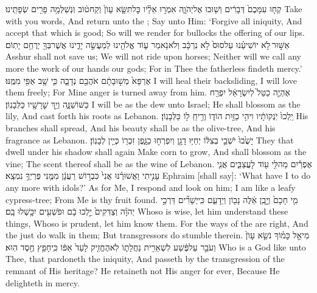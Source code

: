 {קְח֤וּ עִמָּכֶם֙ דְּבָרִ֔ים וְשׁ֖וּבוּ אֶל\maqqaf יְהֹוָ֑ה אִמְר֣וּ אֵלָ֗יו כׇּל\maqqaf תִּשָּׂ֤א עָוֺן֙ וְקַח\maqqaf ט֔וֹב וּֽנְשַׁלְּמָ֥ה פָרִ֖ים שְׂפָתֵֽינוּ׃}
{Take with you words, And return unto the \lord; Say unto Him: ‘Forgive all iniquity, And accept that which is good; So will we render for bullocks the offering of our lips.}
{אַשּׁ֣וּר \legarmeh  לֹ֣א יוֹשִׁיעֵ֗נוּ עַל\maqqaf סוּס֙ לֹ֣א נִרְכָּ֔ב וְלֹא\maqqaf נֹ֥אמַר ע֛וֹד אֱלֹהֵ֖ינוּ לְמַעֲשֵׂ֣ה יָדֵ֑ינוּ אֲשֶׁר\maqqaf בְּךָ֖ יְרֻחַ֥ם יָתֽוֹם׃}
{Asshur shall not save us; We will not ride upon horses; Neither will we call any more the work of our hands our gods; For in Thee the fatherless findeth mercy.’}
{אֶרְפָּא֙ מְשׁ֣וּבָתָ֔ם אֹהֲבֵ֖ם נְדָבָ֑ה כִּ֛י שָׁ֥ב אַפִּ֖י מִמֶּֽנּוּ׃}
{I will heal their backsliding, I will love them freely; For Mine anger is turned away from him.}
{אֶהְיֶ֤ה כַטַּל֙ לְיִשְׂרָאֵ֔ל יִפְרַ֖ח כַּשּׁוֹשַׁנָּ֑ה וְיַ֥ךְ שׇׁרָשָׁ֖יו כַּלְּבָנֽוֹן׃}
{I will be as the dew unto Israel; He shall blossom as the lily, And cast forth his roots as Lebanon.}
{יֵֽלְכוּ֙ יֹֽנְקוֹתָ֔יו וִיהִ֥י כַזַּ֖יִת הוֹד֑וֹ וְרֵ֥יחַֽ ל֖וֹ כַּלְּבָנֽוֹן׃}
{His branches shall spread, And his beauty shall be as the olive-tree, And his fragrance as Lebanon.}
{יָשֻׁ֙בוּ֙ יֹשְׁבֵ֣י בְצִלּ֔וֹ יְחַיּ֥וּ דָגָ֖ן וְיִפְרְח֣וּ כַגָּ֑פֶן זִכְר֖וֹ כְּיֵ֥ין לְבָנֽוֹן׃}
{They that dwell under his shadow shall again Make corn to grow, And shall blossom as the vine; The scent thereof shall be as the wine of Lebanon.}
{אֶפְרַ֕יִם מַה\maqqaf לִּ֥י ע֖וֹד לָעֲצַבִּ֑ים אֲנִ֧י עָנִ֣יתִי וַאֲשׁוּרֶ֗נּוּ אֲנִי֙ כִּבְר֣וֹשׁ רַעֲנָ֔ן מִמֶּ֖נִּי פֶּרְיְךָ֥ נִמְצָֽא׃}
{Ephraim [shall say]: ‘What have I to do any more with idols?’ As for Me, I respond and look on him; I am like a leafy cypress-tree; From Me is thy fruit found.}
{מִ֤י חָכָם֙ וְיָ֣בֵֽן אֵ֔לֶּה נָב֖וֹן וְיֵדָעֵ֑ם כִּֽי\maqqaf יְשָׁרִ֞ים דַּרְכֵ֣י יְהֹוָ֗ה וְצַדִּקִים֙ יֵ֣לְכוּ בָ֔ם וּפֹשְׁעִ֖ים יִכָּ֥שְׁלוּ בָֽם׃}
{Whoso is wise, let him understand these things, Whoso is prudent, let him know them. For the ways of the \lord\space are right, And the just do walk in them; But transgressors do stumble therein.}
\setcounter{chap}{7}
\setcounter{verse}{18}
{מִי\maqqaf אֵ֣ל כָּמ֗וֹךָ נֹשֵׂ֤א עָוֺן֙ וְעֹבֵ֣ר עַל\maqqaf פֶּ֔שַׁע לִשְׁאֵרִ֖ית נַחֲלָת֑וֹ לֹֽא\maqqaf הֶחֱזִ֤יק לָעַד֙ אַפּ֔וֹ כִּֽי\maqqaf חָפֵ֥ץ חֶ֖סֶד הֽוּא׃}
{Who is a God like unto Thee, that pardoneth the iniquity, And passeth by the transgression of the remnant of His heritage? He retaineth not His anger for ever, Because He delighteth in mercy.}
